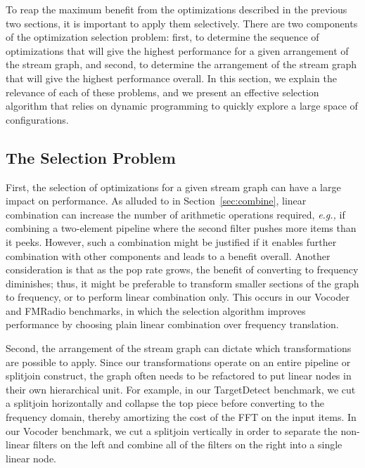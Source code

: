 \documentclass{sig-alternate}
\begin{document}
{To reap the maximum benefit from the optimizations described in the
previous two sections, it is important to apply them selectively.
There are two components of the optimization selection problem: first,
to determine the sequence of optimizations that will give the highest
performance for a given arrangement of the stream graph, and second,
to determine the arrangement of the stream graph that will give the
highest performance overall.  In this section, we explain the
relevance of each of these problems, and we present an effective
selection algorithm that relies on dynamic programming to quickly
explore a large space of configurations.

\subsection{The Selection Problem}

First, the selection of optimizations for a given stream graph can
have a large impact on performance.  As alluded to in
Section~\ref{sec:combine}, linear combination can increase the number
of arithmetic operations required, {\it e.g.,} if combining a
two-element pipeline where the second filter pushes more items than it
peeks.  However, such a combination might be justified if it enables
further combination with other components and leads to a benefit
overall.  Another consideration is that as the pop rate grows, the
benefit of converting to frequency diminishes; thus, it might be
preferable to transform smaller sections of the graph to frequency, or
to perform linear combination only.  This occurs in our Vocoder and
FMRadio benchmarks, in which the selection algorithm improves
performance by choosing plain linear combination over frequency
translation.

Second, the arrangement of the stream graph can dictate which
transformations are possible to apply.  Since our transformations
operate on an entire pipeline or splitjoin construct, the graph often
needs to be refactored to put linear nodes in their own hierarchical
unit.  For example, in our TargetDetect benchmark, we cut a splitjoin
horizontally and collapse the top piece before converting to the
frequency domain, thereby amortizing the cost of the FFT on the input
items.
In our Vocoder benchmark, we cut a splitjoin vertically in order to
separate the non-linear filters on the left and combine all of the
filters on the right into a single linear node.

}
\end{document}
